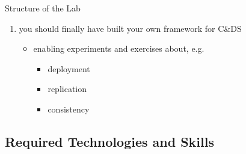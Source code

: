 \documentclass[presentation]{beamer}\mode<presentation>{\usetheme{AMSCesenaPurpleAndGold}}
\begin{document}
\begin{frame}[c,allowframebreaks]{Structure of the Lab}
\begin{enumerate}
		\medskip

		\item you should finally have built your own framework for C\&DS
		\begin{itemize}
			\item enabling experiments and exercises about, e.g.
			\begin{itemize}
				\item deployment
				\item replication
				\item consistency
			\end{itemize}
		\end{itemize}

	\end{enumerate}

\end{frame}

\subsection{Required Technologies and Skills}
\end{document}
